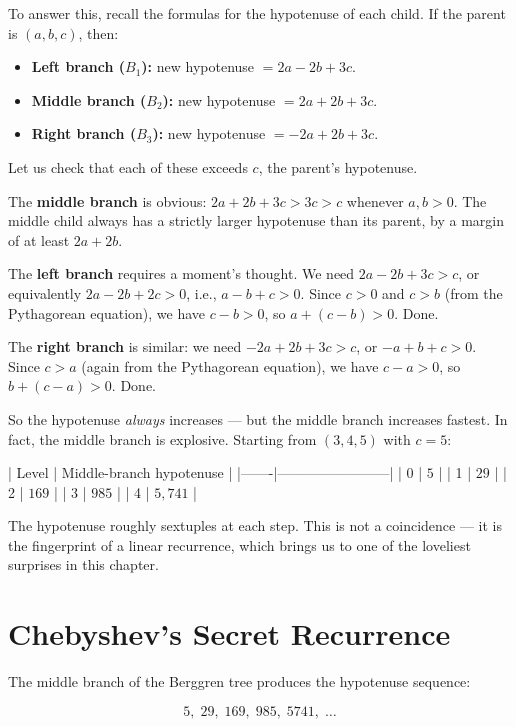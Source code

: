 \documentclass[11pt,twoside,openright]{book}
\theoremstyle{definition}
\theoremstyle{remark}
\begin{document}
To answer this, recall the formulas for the hypotenuse of each child. If the parent is $(a, b, c)$, then:

\begin{itemize}
  \item \textbf{Left branch ($B_1$):} new hypotenuse $= 2a - 2b + 3c$.
  \item \textbf{Middle branch ($B_2$):} new hypotenuse $= 2a + 2b + 3c$.
  \item \textbf{Right branch ($B_3$):} new hypotenuse $= -2a + 2b + 3c$.
\end{itemize}

Let us check that each of these exceeds $c$, the parent's hypotenuse.

The \textbf{middle branch} is obvious: $2a + 2b + 3c > 3c > c$ whenever $a, b > 0$. The middle child always has a strictly larger hypotenuse than its parent, by a margin of at least $2a + 2b$.

The \textbf{left branch} requires a moment's thought. We need $2a - 2b + 3c > c$, or equivalently $2a - 2b + 2c > 0$, i.e., $a - b + c > 0$. Since $c > 0$ and $c > b$ (from the Pythagorean equation), we have $c - b > 0$, so $a + (c - b) > 0$. Done.

The \textbf{right branch} is similar: we need $-2a + 2b + 3c > c$, or $-a + b + c > 0$. Since $c > a$ (again from the Pythagorean equation), we have $c - a > 0$, so $b + (c - a) > 0$. Done.

So the hypotenuse \textit{always} increases --- but the middle branch increases fastest. In fact, the middle branch is explosive. Starting from $(3, 4, 5)$ with $c = 5$:

| Level | Middle-branch hypotenuse |
|-------|------------------------|
| 0 | $5$ |
| 1 | $29$ |
| 2 | $169$ |
| 3 | $985$ |
| 4 | $5{,}741$ |

The hypotenuse roughly sextuples at each step. This is not a coincidence --- it is the fingerprint of a linear recurrence, which brings us to one of the loveliest surprises in this chapter.



\section{Chebyshev's Secret Recurrence}

The middle branch of the Berggren tree produces the hypotenuse sequence:

\[5, \; 29, \; 169, \; 985, \; 5741, \; \ldots\]
\end{document}
